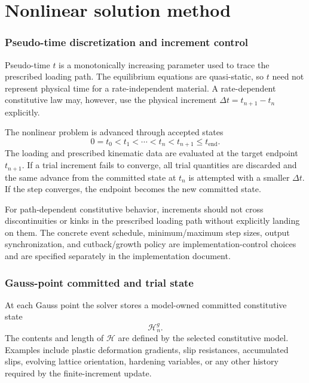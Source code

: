 \documentclass[11pt,a4paper]{article}
\begin{document}
\part{Nonlinear solution method}

\section{Pseudo-time discretization and increment control}
\label{sec:time-increments}

Pseudo-time $t$ is a monotonically increasing parameter used to trace the prescribed loading path. The equilibrium equations are quasi-static, so $t$ need not represent physical time for a rate-independent material. A rate-dependent constitutive law may, however, use the physical increment $\Delta t=t_{n+1}-t_n$ explicitly.

The nonlinear problem is advanced through accepted states
\begin{equation}
0=t_0<t_1<\cdots<t_n<t_{n+1}\le t_{\mathrm{end}}.
\end{equation}
The loading and prescribed kinematic data are evaluated at the target endpoint $t_{n+1}$. If a trial increment fails to converge, all trial quantities are discarded and the same advance from the committed state at $t_n$ is attempted with a smaller $\Delta t$. If the step converges, the endpoint becomes the new committed state.

For path-dependent constitutive behavior, increments should not cross discontinuities or kinks in the prescribed loading path without explicitly landing on them. The concrete event schedule, minimum/maximum step sizes, output synchronization, and cutback/growth policy are implementation-control choices and are specified separately in the implementation document.

\section{Gauss-point committed and trial state}
\label{sec:gp-state}

At each Gauss point the solver stores a model-owned committed constitutive state
\begin{equation}
\mathcal H_n^g.
\end{equation}
The contents and length of $\mathcal H$ are defined by the selected constitutive model. Examples include plastic deformation gradients, slip resistances, accumulated slips, evolving lattice orientation, hardening variables, or any other history required by the finite-increment update.
\end{document}
